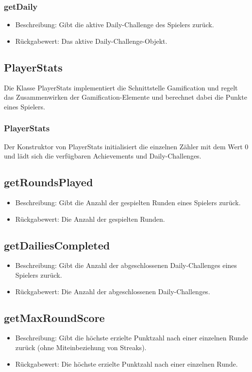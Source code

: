 \documentclass[a4paper]{scrreprt}
\begin{document}
	\subsubsection{getDaily}
	\begin{itemize}
		\item Beschreibung: Gibt die aktive Daily-Challenge des Spielers zurück.
		\item Rückgabewert: Das aktive Daily-Challenge-Objekt.
	\end{itemize}



	\subsection{PlayerStats}
	Die Klasse PlayerStats implementiert die Schnittstelle Gamification und regelt das Zusammenwirken der Gamification-Elemente und berechnet dabei die Punkte eines Spielers.

	\subsubsection{PlayerStats}
	Der Konstruktor von PlayerStats initialisiert die einzelnen Zähler mit dem Wert 0 und lädt sich die verfügbaren Achievements und Daily-Challenges.
	\subsection{getRoundsPlayed}
	\begin{itemize}
		\item Beschreibung: Gibt die Anzahl der gespielten Runden eines Spielers zurück.
		\item Rückgabewert: Die Anzahl der gespielten Runden.
	\end{itemize}
	\subsection{getDailiesCompleted}
	\begin{itemize}
		\item Beschreibung: Gibt die Anzahl der abgeschlossenen Daily-Challenges eines Spielers zurück.
		\item Rückgabewert: Die Anzahl der abgeschlossenen Daily-Challenges.
	\end{itemize}
	\subsection{getMaxRoundScore}
	\begin{itemize}
		\item Beschreibung: Gibt die höchste erzielte Punktzahl nach einer einzelnen Runde zurück (ohne Miteinbeziehung von Streaks).
		\item Rückgabewert: Die höchste erzielte Punktzahl nach einer einzelnen Runde.
	\end{itemize}
\end{document}
